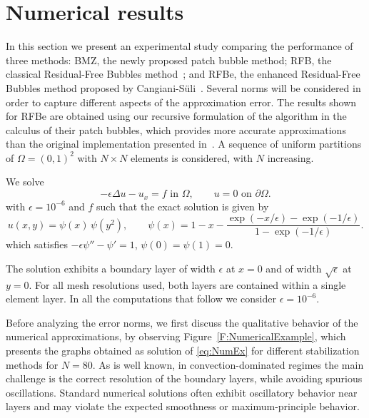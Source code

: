 \documentclass{article}
\begin{document}
\section{Numerical results}\label{Sec:numerics}
In this section we present an experimental study comparing the performance of three methods: BMZ, the newly proposed patch bubble method; RFB, the classical Residual-Free Bubbles method~\cite{Brezzi1994}; and RFBe, the enhanced Residual-Free Bubbles method proposed by Cangiani-S\"uli~\cite{Cangiani2005long}. Several norms will be considered in order to capture different aspects of the approximation error.
The results shown for RFBe are obtained using our recursive formulation of the algorithm in the calculus of their patch bubbles, which provides more accurate approximations than the original implementation presented in~\cite{Cangiani2005short}.
A sequence of uniform partitions of $\Omega=(0,1)^2$ with $N\times N$ elements is considered, with $N$ increasing.

We solve
\begin{equation}
    \label{eq:NumEx}
-\epsilon \Delta u - u_x = f \text{ in $\Omega$},
\qquad u=0  \text{ on $\partial\Omega$}.
\end{equation}
with $\epsilon = 10^{-6}$ and $f$ such that the exact solution is given by
\begin{equation*}
 u(x,y) = \psi(x)\,\psi(y^2),
 \qquad \psi(x) = 1-x - \frac{\exp(-x/\epsilon) - \exp(-1/\epsilon) }{  1 - \exp(-1/\epsilon) }.
\end{equation*}
which satisfies $-\epsilon \psi'' - \psi' = 1$, $\psi(0)=\psi(1)=0$. %

The solution exhibits a boundary layer of width $\epsilon$ at $x=0$ and of width $\sqrt{\epsilon}$ at $y=0$. For all mesh resolutions used, both layers are contained within a single element layer.
In all the computations that follow we consider $\epsilon = 10^{-6}$.

Before analyzing the error norms, we first discuss the qualitative behavior of the numerical approximations, by observing
Figure~\ref{F:NumericalExample}, which presents the graphs obtained as solution of \eqref{eq:NumEx} for different stabilization methods for $N=80$. 
As is well known, in convection-dominated regimes the main challenge is the correct resolution of the boundary layers, while avoiding spurious oscillations. Standard numerical solutions often exhibit oscillatory behavior near layers and may violate the expected smoothness or maximum-principle behavior.
\end{document}
